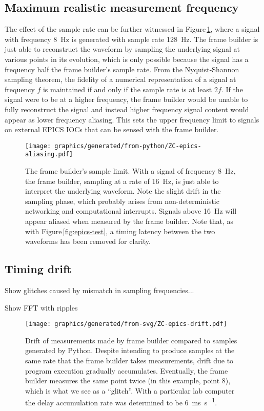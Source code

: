 \subsection{Maximum realistic measurement frequency}
The effect of the sample rate can be further witnessed in Figure\,\ref{fig:sample-aliasing}, where a signal with frequency \SI{8}{\hertz} is generated with sample rate \SI{128}{\hertz}. The frame builder is just able to reconstruct the waveform by sampling the underlying signal at various points in its evolution, which is only possible because the signal has a frequency half the frame builder's sample rate. From the Nyquist-Shannon sampling theorem, the fidelity of a numerical representation of a signal at frequency $f$ is maintained if and only if the sample rate is at least $2f$. If the signal were to be at a higher frequency, the frame builder would be unable to fully reconstruct the signal and instead higher frequency signal content would appear as lower frequency aliasing. This sets the upper frequency limit to signals on external \gls{EPICS} \glspl{IOC} that can be sensed with the frame builder.

\begin{figure}
  \centering
  \texttt{[image: graphics/generated/from-python/ZC-epics-aliasing.pdf]}
  \caption[Signal aliasing in the frame builder]{\label{fig:sample-aliasing}The frame builder's sample limit. With a signal of frequency \SI{8}{\hertz}, the frame builder, sampling at a rate of \SI{16}{\hertz}, is just able to interpret the underlying waveform. Note the slight drift in the sampling phase, which probably arises from non-deterministic networking and computational interrupts. Signals above \SI{16}{\hertz} will appear aliased when measured by the frame builder. Note that, as with Figure\,\ref{fig:epics-test}, a timing latency between the two waveforms has been removed for clarity.}
\end{figure}

\subsection{Timing drift}
Show glitches caused by mismatch in sampling frequencies...

Show FFT with ripples

\begin{figure}
  \centering
  \texttt{[image: graphics/generated/from-svg/ZC-epics-drift.pdf]}
  \caption[Drift of measurements made by frame builder compared to samples generated by Python]{\label{fig:epics-drift}Drift of measurements made by frame builder compared to samples generated by Python. Despite intending to produce samples at the same rate that the frame builder takes measurements, drift due to program execution gradually accumulates. Eventually, the frame builder measures the same point twice (in this example, point 8), which is what we see as a ``glitch''. With a particular lab computer the delay accumulation rate was determined to be \SI{6}{\milli\second\per\second}.}
\end{figure}

